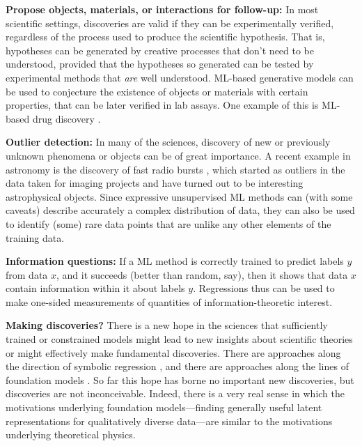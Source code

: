 \documentclass{article}
\renewcommand{\paragraph}[1]{\noindent\par\textbf{#1}}
\begin{document}
\paragraph{Propose objects, materials, or interactions for follow-up:}
In most scientific settings, discoveries are valid if they can be experimentally verified, regardless of the process used to produce the scientific hypothesis.
That is, hypotheses can be generated by creative processes that don't need to be understood, provided that the hypotheses so generated can be tested by experimental methods that \emph{are} well understood.
ML-based generative models can be used to conjecture the existence of objects or materials with certain properties, that can be later verified in lab assays.
One example of this is ML-based drug discovery \cite{kang2018conditional}. 

\paragraph{Outlier detection:}
In many of the sciences, discovery of new or previously unknown phenomena or objects can be of great importance.
A recent example in astronomy is the discovery of fast radio bursts \cite{frbs}, which started as outliers in the data taken for imaging projects and have turned out to be interesting astrophysical objects.
Since expressive unsupervised ML methods can (with some caveats) describe accurately a complex distribution of data, they can also be used to identify (some) rare data points that are unlike any other elements of the training data.

\paragraph{Information questions:}
If a ML method is correctly trained to predict labels $y$ from data $x$, and it succeeds (better than random, say), then it shows that data $x$ contain information within it about labels $y$.
Regressions thus can be used to make one-sided measurements of quantities of information-theoretic interest.

\paragraph{Making discoveries?}
There is a new hope in the sciences that sufficiently trained or constrained models might lead to new insights about scientific theories or might effectively make fundamental discoveries.
There are approaches along the direction of symbolic regression \cite{symbolic1, symbolic2}, and there are approaches along the lines of foundation models \cite{foundation1}.
So far this hope has borne no important new discoveries, but discoveries are not inconceivable.
Indeed, there is a very real sense in which the motivations underlying foundation models---finding generally useful latent representations for qualitatively diverse data---are similar to the motivations underlying theoretical physics.
\end{document}
